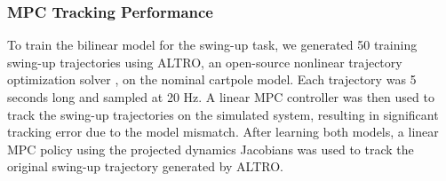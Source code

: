\documentclass{article}
\begin{document}
      
      
      \subsubsection{MPC Tracking Performance}
      
      To train the bilinear model for the swing-up task, we generated 50 training swing-up
      trajectories using ALTRO, an open-source nonlinear trajectory optimization solver 
      \cite{Howell2019,Jackson2021}, on the nominal cartpole model. Each trajectory was 5 seconds
      long and sampled at 20 Hz.  A linear MPC controller was then used to track the swing-up
      trajectories on the simulated system, resulting in significant tracking error due to the
      model mismatch.  After learning both models, a linear MPC policy using the projected 
      dynamics Jacobians was used to track the original swing-up trajectory generated by ALTRO. 
      
\end{document}
